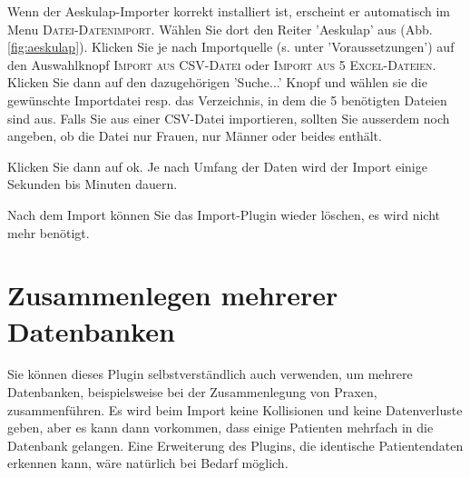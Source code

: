 \documentclass[a4paper]{scrartcl}
\begin{document}
Wenn der Aeskulap-Importer korrekt installiert ist, erscheint er automatisch im Menu \textsc{Datei-Datenimport}. Wählen Sie dort den Reiter 'Aeskulap' aus (Abb. \ref{fig:aeskulap}). Klicken Sie je nach Importquelle (s. unter 'Voraussetzungen') auf den Auswahlknopf \textsc{Import aus CSV-Datei} oder \textsc{Import aus 5 Excel-Dateien}. Klicken Sie dann auf den dazugehörigen 'Suche...' Knopf und wählen sie die gewünschte Importdatei resp. das Verzeichnis, in dem die 5 benötigten Dateien sind aus.
Falls Sie aus einer CSV-Datei importieren, sollten Sie ausserdem noch angeben, ob die Datei nur Frauen, nur Männer oder beides enthält.

Klicken Sie dann auf ok. Je nach Umfang der Daten wird der Import einige Sekunden bis Minuten dauern.

\bigskip

Nach dem Import können Sie das Import-Plugin wieder löschen, es wird nicht mehr benötigt.

\section{Zusammenlegen mehrerer Datenbanken}
Sie können dieses Plugin selbstverständlich auch verwenden, um mehrere Datenbanken, beispielsweise bei der Zusammenlegung von Praxen, zusammenführen. Es wird beim Import keine Kollisionen und keine Datenverluste geben, aber es kann dann vorkommen, dass einige Patienten mehrfach in die Datenbank gelangen. Eine Erweiterung des Plugins, die identische Patientendaten erkennen kann, wäre natürlich bei Bedarf möglich.
\end{document}
